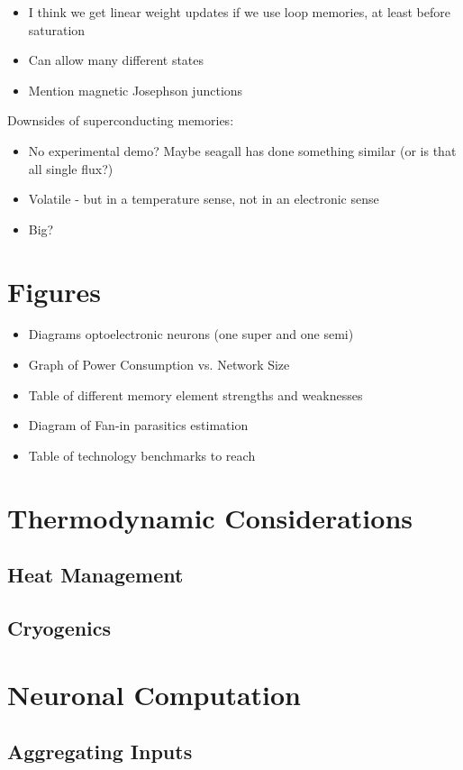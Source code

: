 \documentclass{article}
\begin{document}
\begin{itemize}
\item I think we get linear weight updates if we use loop memories, at least before saturation
\item Can allow many different states
\item Mention magnetic Josephson junctions
\end{itemize}

Downsides of superconducting memories:

\begin{itemize}
    \item No experimental demo? Maybe seagall has done something similar (or is that all single flux?)
    \item Volatile - but in a temperature sense, not in an electronic sense
    \item Big?
\end{itemize}


\section{Figures}
\begin{itemize}
  \item Diagrams optoelectronic neurons (one super and one semi)
  \item Graph of Power Consumption vs. Network Size
  \item Table of different memory element strengths and weaknesses
  \item Diagram of Fan-in parasitics estimation
  \item Table of technology benchmarks to reach
\end{itemize}

\section{Thermodynamic Considerations}
\subsection{Heat Management}
\subsection{Cryogenics}
\section{Neuronal Computation}
\subsection{Aggregating Inputs}
\end{document}
